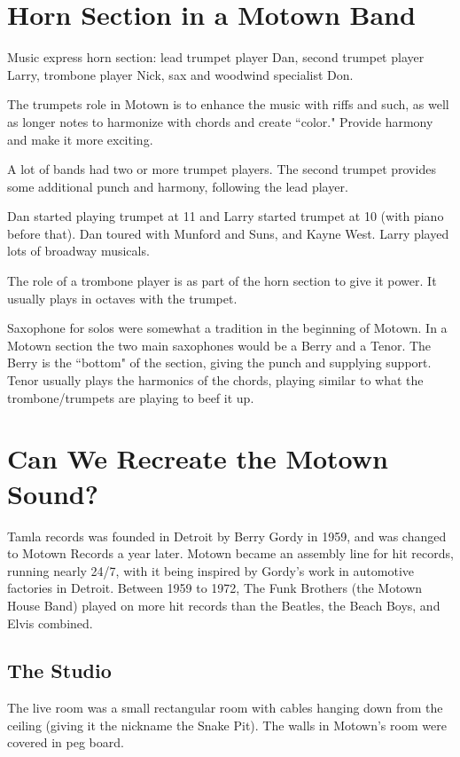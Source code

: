 \documentclass[12pt, a4paper, twoside, openright, titlepage]{book}
\begin{document}
\section{Horn Section in a Motown Band}

Music express horn section: lead trumpet player Dan, second trumpet player Larry, trombone player Nick, sax and woodwind specialist Don. 

The trumpets role in Motown is to enhance the music with riffs and such, as well as longer notes to harmonize with chords and create ``color." Provide harmony and make it more exciting.

A lot of bands had two or more trumpet players. The second trumpet provides some additional punch and harmony, following the lead player.

Dan started playing trumpet at 11 and Larry started trumpet at 10 (with piano before that). Dan toured with Munford and Suns, and Kayne West. Larry played lots of broadway musicals. 


The role of a trombone player is as part of the horn section to give it power. It usually plays in octaves with the trumpet. 


Saxophone for solos were somewhat a tradition in the beginning of Motown. In a Motown section the two main saxophones would be a Berry and a Tenor. The Berry is the ``bottom" of the section, giving the punch and supplying support. Tenor usually plays the harmonics of the chords, playing similar to what the trombone/trumpets are playing to beef it up. 


\section{Can We Recreate the Motown Sound?}

Tamla records was founded in Detroit by Berry Gordy in 1959, and was changed to Motown Records a year later. Motown became an assembly line for hit records, running nearly 24/7, with it being inspired by Gordy's work in automotive factories in Detroit. Between 1959 to 1972, The Funk Brothers (the Motown House Band) played on more hit records than the Beatles, the Beach Boys, and Elvis combined.


\subsection{The Studio}

The live room was a small rectangular room with cables hanging down from the ceiling (giving it the nickname the Snake Pit). The walls in Motown's room were covered in peg board. 
\end{document}

